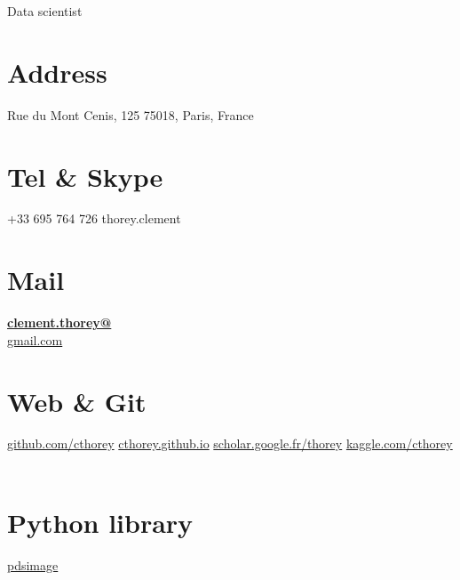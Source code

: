 \documentclass[]{friggeri-cv}
\begin{document}
      {Data scientist}
      


\begin{aside}
  \section{Address}
    Rue du Mont Cenis, 125
    75018, Paris, France
    ~
  \section{Tel \& Skype}
    +33 695 764 726
    thorey.clement
    ~
  \section{Mail}
    \href{mailto:clement.thorey@gmail.com}{\textbf{clement.thorey@}\\gmail.com}
    ~
  \section{Web \& Git}
    \href{https://github.com/cthorey}{github.com/cthorey}
    \href{http://cthorey.github.io./}{cthorey.github.io}
    \href{https://scholar.google.fr/citations?user=p5M6SxAAAAAJ&hl=fr&oi=ao}{scholar.google.fr/thorey}
    \href{https://www.kaggle.com/cthorey/}{kaggle.com/cthorey}
    ~
  \section{Python library}
    \href{http://pdsimage.readthedocs.org/en/latest/}{pdsimage}
  ~  

\end{aside}
\end{document}
